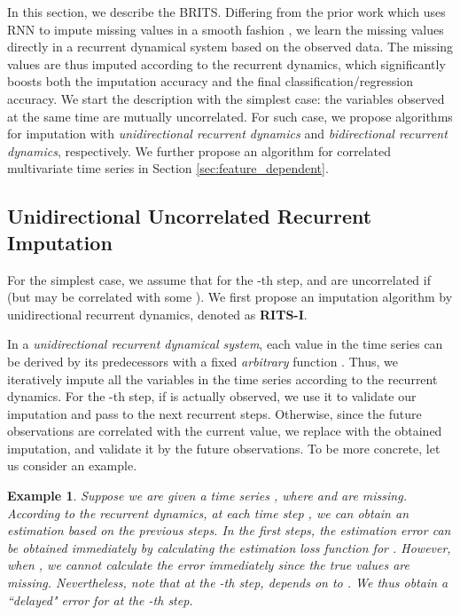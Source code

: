 \documentclass{article}
\newcommand{\methodname}{\xspace{BRITS}}
\newtheorem{example}{Example}
\begin{document}
In this section, we describe the \methodname.  Differing from the prior work which uses RNN to impute missing values in a smooth fashion \cite{che2018recurrent}, we learn the missing values directly in a recurrent dynamical system \cite{pascanu2013difficulty,sussillo2013opening} based on the observed data. The missing values are thus imputed according to the recurrent dynamics, which significantly boosts both the imputation accuracy and the final classification/regression accuracy.
We start the description with the simplest case: the variables observed at the same time are mutually uncorrelated. For such case, we propose algorithms for imputation with {\em unidirectional recurrent dynamics} and {\em bidirectional recurrent dynamics}, respectively. We further propose an algorithm for correlated multivariate time series in Section \ref{sec:feature_dependent}.

\subsection{Unidirectional Uncorrelated Recurrent Imputation}
\label{sec:uni_impute}
For the simplest case, we assume that for the -th step,  and  are uncorrelated if  (but  may be correlated with some ). We first propose an imputation algorithm by unidirectional recurrent dynamics, denoted as {\bf RITS-I}.

In a {\em unidirectional recurrent dynamical system}, each value in the time series can be derived by its predecessors with a fixed {\em arbitrary} function \cite{brakel2013training,ozaki19852,basharat2009time}. Thus, we iteratively impute all the variables in the time series according to the  recurrent dynamics. For the -th step, if  is actually observed, we use it to validate our imputation and pass  to the next recurrent steps. Otherwise, since the future observations are correlated with the current  value, 
we replace  with the obtained imputation, and validate it by the future observations. To be more concrete, let us consider an example.


\begin{example}
\label{example:forward}
Suppose we are given a time series , where  and  are missing.  According to the recurrent dynamics, at each time step , we can  obtain an estimation  based on  the previous  steps. In the first  steps, the estimation error can be obtained immediately by calculating the estimation loss function  for . However, when , we cannot calculate the error immediately since the true values are missing. Nevertheless, note that  at the -th step,  depends on  to . We thus obtain a ``delayed" error for  at the -th step.
\end{example}
\end{document}
